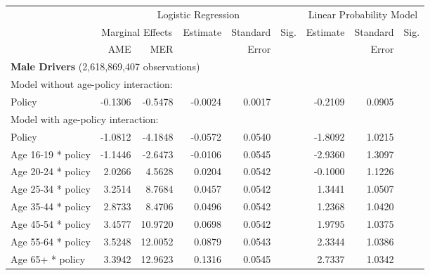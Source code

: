 \documentclass{cje}
\begin{document}
\begin{table}%
\centering 
\begin{tabular}{l r r r r l r r l} 

\hline 
 
 & \multicolumn{5}{c}{Logistic Regression}  & \multicolumn{3}{c}{Linear Probability Model} \\ 

 \cmidrule(lr){2-6}\cmidrule(lr){7-9} 
 & \multicolumn{2}{c}{Marginal Effects} & Estimate & Standard & Sig. & Estimate & Standard & Sig. \\ 

 \cmidrule(lr){2-3} 
 &   AME &  MER  &          &  Error   &      &          &  Error   &     \\ 

\hline 
 
\multicolumn{8}{l}{\textbf{Male Drivers} (2,618,869,407 observations)} \\ 

\hline
\multicolumn{8}{l}{Model without age-policy interaction: } \\ 
Policy                   &  -0.1306        &  -0.5478       &  -0.0024        &  0.0017       &            &  -0.2109        &  0.0905       &            \\ 
\hline
\multicolumn{8}{l}{Model with age-policy interaction: } \\ 
Policy                   &  -1.0812        &  -4.1848       &  -0.0572        &  0.0540       &            &  -1.8092        &  1.0215       &            \\ 
Age 16-19 * policy   &  -1.1446        &  -2.6473       &  -0.0106        &  0.0545       &            &  -2.9360        &  1.3097       &            \\ 
Age 20-24 * policy   &  2.0266        &  4.5628       &  0.0204        &  0.0542       &            &  -0.1000        &  1.1226       &            \\ 
Age 25-34 * policy   &  3.2514        &  8.7684       &  0.0457        &  0.0542       &            &  1.3441        &  1.0507       &            \\ 
Age 35-44 * policy   &  2.8733        &  8.4706       &  0.0496        &  0.0542       &            &  1.2368        &  1.0420       &            \\ 
Age 45-54 * policy   &  3.4577        &  10.9720       &  0.0698        &  0.0542       &            &  1.9795        &  1.0375       &            \\ 
Age 55-64 * policy   &  3.5248        &  12.0052       &  0.0879        &  0.0543       &            &  2.3344        &  1.0386       &            \\ 
Age 65+ * policy   &  3.3942        &  12.9623       &  0.1316        &  0.0545       &            &  2.7337        &  1.0342       &            \\ 


\end{tabular}
\end{table}
\end{document}
